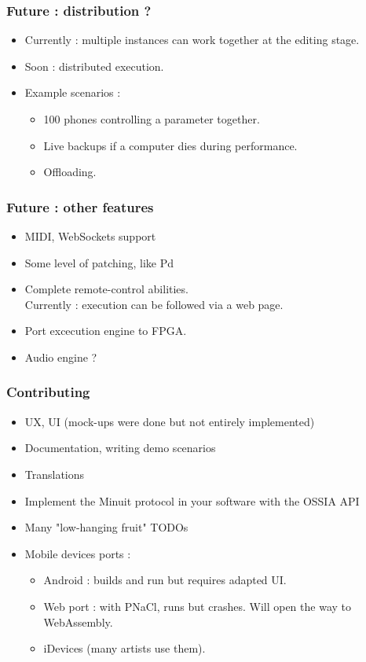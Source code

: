 \documentclass{beamer}
\begin{document}
\begin{frame}
    \frametitle{Future : distribution ?}
    
    \Large
    \begin{itemize}
    	\item Currently : multiple instances can work together at the editing stage.
    	\item Soon : distributed execution.
    	\item Example scenarios :
    	\begin{itemize}
    		\item \large  100 phones controlling a parameter together.
    		\item Live backups if a computer dies during performance.
    		\item Offloading.
    	\end{itemize}
    	 
    \end{itemize}
\end{frame}

\begin{frame}
    \frametitle{Future : other features}
    \Large
    \begin{itemize}
    \item MIDI, WebSockets support
    \item Some level of patching, like Pd
    \item Complete remote-control abilities.\\ Currently : execution can be followed via a web page.
    \item Port excecution engine to FPGA. 
    \item Audio engine ? 
    \end{itemize}
\end{frame}

\begin{frame}
    \frametitle{Contributing}   
    \large 
    \begin{itemize}
    \item UX, UI (mock-ups were done but not entirely implemented)
    \item Documentation, writing demo scenarios
    \item Translations    
    \item Implement the Minuit protocol in your software with the OSSIA API    
    \item Many "low-hanging fruit" TODOs
    \item Mobile devices ports : 
    \begin{itemize}
        \item Android : builds and run but requires adapted UI.
        \item Web port : with PNaCl, runs but crashes. Will open the way to WebAssembly. 
        \item iDevices (many artists use them).
    \end{itemize}
\end{itemize}
    
\end{frame}
\end{document}
